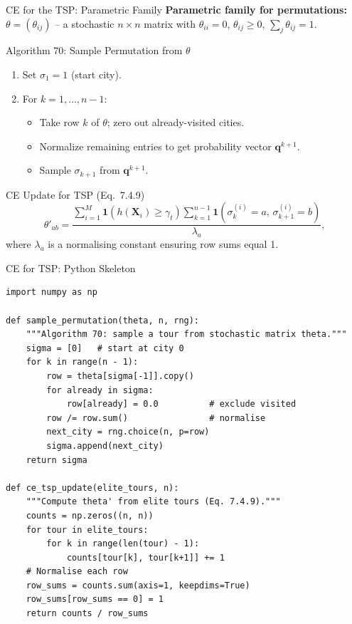 \documentclass[aspectratio=169,10pt]{beamer}
\begin{document}
\begin{frame}{CE for the TSP: Parametric Family}
  \textbf{Parametric family for permutations:}
  $\theta = (\theta_{ij})$ -- a stochastic $n\times n$ matrix with
  $\theta_{ii} = 0$, $\theta_{ij} \ge 0$, $\sum_j \theta_{ij} = 1$.

  \begin{block}{Algorithm 70: Sample Permutation from $\theta$}
    \begin{enumerate}
      \item Set $\sigma_1 = 1$ (start city).
      \item For $k=1,\ldots,n-1$:
        \begin{itemize}
          \item Take row $k$ of $\theta$; zero out already-visited cities.
          \item Normalize remaining entries to get probability vector $\mathbf{q}^{k+1}$.
          \item Sample $\sigma_{k+1}$ from $\mathbf{q}^{k+1}$.
        \end{itemize}
    \end{enumerate}
  \end{block}

  \begin{block}{CE Update for TSP (Eq.~7.4.9)}
    \[
      \theta'_{ab}
      = \frac{\displaystyle\sum_{i=1}^M \mathbf{1}(h(\mathbf{X}_i)\ge\gamma_t)
               \sum_{k=1}^{n-1}\mathbf{1}(\sigma_k^{(i)}=a,\,\sigma_{k+1}^{(i)}=b)}
             {\displaystyle\lambda_a},
    \]
    where $\lambda_a$ is a normalising constant ensuring row sums equal 1.
  \end{block}
\end{frame}

\begin{frame}[fragile]{CE for TSP: Python Skeleton}
  \begin{lstlisting}[style=python]
import numpy as np

def sample_permutation(theta, n, rng):
    """Algorithm 70: sample a tour from stochastic matrix theta."""
    sigma = [0]   # start at city 0
    for k in range(n - 1):
        row = theta[sigma[-1]].copy()
        for already in sigma:
            row[already] = 0.0          # exclude visited
        row /= row.sum()                # normalise
        next_city = rng.choice(n, p=row)
        sigma.append(next_city)
    return sigma

def ce_tsp_update(elite_tours, n):
    """Compute theta' from elite tours (Eq. 7.4.9)."""
    counts = np.zeros((n, n))
    for tour in elite_tours:
        for k in range(len(tour) - 1):
            counts[tour[k], tour[k+1]] += 1
    # Normalise each row
    row_sums = counts.sum(axis=1, keepdims=True)
    row_sums[row_sums == 0] = 1
    return counts / row_sums
  \end{lstlisting}
\end{frame}
\end{document}
